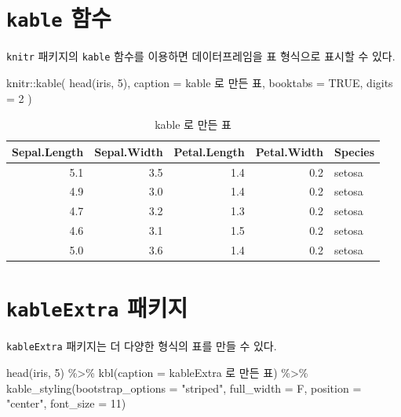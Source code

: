 \documentclass[
]{book}
\newenvironment{Shaded}{\begin{snugshade}}{\end{snugshade}}
\newcommand{\AttributeTok}[1]{\textcolor[rgb]{0.77,0.63,0.00}{#1}}
\newcommand{\ConstantTok}[1]{\textcolor[rgb]{0.00,0.00,0.00}{#1}}
\newcommand{\DecValTok}[1]{\textcolor[rgb]{0.00,0.00,0.81}{#1}}
\newcommand{\FunctionTok}[1]{\textcolor[rgb]{0.00,0.00,0.00}{#1}}
\newcommand{\NormalTok}[1]{#1}
\newcommand{\SpecialCharTok}[1]{\textcolor[rgb]{0.00,0.00,0.00}{#1}}
\newcommand{\StringTok}[1]{\textcolor[rgb]{0.31,0.60,0.02}{#1}}
\theoremstyle{definition}
\theoremstyle{definition}
\theoremstyle{definition}
\theoremstyle{definition}
\theoremstyle{remark}
\begin{document}
\hypertarget{kable-uxd568uxc218}{%
\section{\texorpdfstring{\texttt{kable} 함수}{kable 함수}}\label{kable-uxd568uxc218}}

\texttt{knitr} 패키지의 \texttt{kable} 함수를 이용하면 데이터프레임을 표 형식으로 표시할 수 있다.

\begin{Shaded}
\begin{Highlighting}[]
\NormalTok{knitr}\SpecialCharTok{::}\FunctionTok{kable}\NormalTok{(}
  \FunctionTok{head}\NormalTok{(iris, }\DecValTok{5}\NormalTok{), }\AttributeTok{caption =} \StringTok{\textquotesingle{}kable 로 만든 표\textquotesingle{}}\NormalTok{,}
  \AttributeTok{booktabs =} \ConstantTok{TRUE}\NormalTok{,}
  \AttributeTok{digits =} \DecValTok{2}
\NormalTok{)}
\end{Highlighting}
\end{Shaded}

\begin{table}

\caption{\label{tab:tble1}kable 로 만든 표}
\centering
\begin{tabular}[t]{rrrrl}
\toprule
Sepal.Length & Sepal.Width & Petal.Length & Petal.Width & Species\\
\midrule
5.1 & 3.5 & 1.4 & 0.2 & setosa\\
4.9 & 3.0 & 1.4 & 0.2 & setosa\\
4.7 & 3.2 & 1.3 & 0.2 & setosa\\
4.6 & 3.1 & 1.5 & 0.2 & setosa\\
5.0 & 3.6 & 1.4 & 0.2 & setosa\\
\bottomrule
\end{tabular}
\end{table}

\hypertarget{kableextra-uxd328uxd0a4uxc9c0}{%
\section{\texorpdfstring{\texttt{kableExtra} 패키지}{kableExtra 패키지}}\label{kableextra-uxd328uxd0a4uxc9c0}}

\texttt{kableExtra} 패키지는 더 다양한 형식의 표를 만들 수 있다.

\begin{Shaded}
\begin{Highlighting}[]
\FunctionTok{head}\NormalTok{(iris, }\DecValTok{5}\NormalTok{) }\SpecialCharTok{\%\textgreater{}\%}
  \FunctionTok{kbl}\NormalTok{(}\AttributeTok{caption =} \StringTok{\textquotesingle{}kableExtra 로 만든 표\textquotesingle{}}\NormalTok{) }\SpecialCharTok{\%\textgreater{}\%}
  \FunctionTok{kable\_styling}\NormalTok{(}\AttributeTok{bootstrap\_options =} \StringTok{"striped"}\NormalTok{, }\AttributeTok{full\_width =}\NormalTok{ F, }\AttributeTok{position =} \StringTok{"center"}\NormalTok{, }\AttributeTok{font\_size =} \DecValTok{11}\NormalTok{)}
\end{Highlighting}
\end{Shaded}
\end{document}
